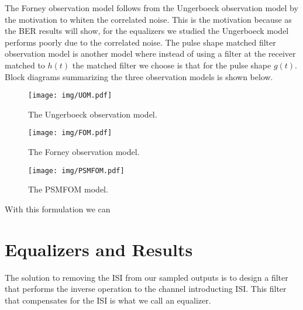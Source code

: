 The Forney observation model follows from the Ungerboeck observation model by the motivation to whiten the correlated noise. This is the motivation because as the BER results will show, for the equalizers we studied the Ungerboeck model performs poorly due to the correlated noise. The pulse shape matched filter observation model is another model where instead of using a filter at the receiver matched to $h(t)$ the matched filter we choose is that for the pulse shape $g(t)$. Block diagrams summarizing the three observation models is shown below.
\begin{figure}[H]
\centering
\texttt{[image: img/UOM.pdf]}
\caption{The Ungerboeck observation model.}
\end{figure}
\begin{figure}[H]
\centering
\texttt{[image: img/FOM.pdf]}
\caption{The Forney observation model.}
\end{figure}
\begin{figure}[H]
\centering
\texttt{[image: img/PSMFOM.pdf]}
\caption{The PSMFOM model.}
\end{figure}

With this formulation we can 

\section{Equalizers and Results}
The solution to removing the ISI from our sampled outputs is to design a filter that performs the inverse operation to the channel introducting ISI. This filter that compensates for the ISI is what we call an equalizer.





